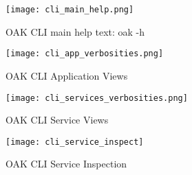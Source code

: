 \begin{figure}[p]
    \begin{adjustwidth}{-0.1\paperwidth}{-0.1\paperwidth}
        \centering
        \texttt{[image: cli\_main\_help.png]}
        \caption{OAK CLI main help text: oak -h}
        \label{fig:cli_main_help}
    \end{adjustwidth}

    \begin{adjustwidth}{-0.2\paperwidth}{-0.2\paperwidth}
        \centering
        \texttt{[image: cli\_app\_verbosities.png]}
        \caption{OAK CLI Application Views}
        \label{fig:cli_app_views}
    \end{adjustwidth}
\end{figure}

\begin{figure}[p]
    \centering
    \texttt{[image: cli\_services\_verbosities.png]}
    \caption{OAK CLI Service Views}
    \label{fig:cli_service_views}
\end{figure}

\begin{figure}[p]
    \begin{adjustwidth}{-0.1\paperwidth}{-0.1\paperwidth}
        \centering
        \texttt{[image: cli\_service\_inspect]}
        \caption{OAK CLI Service Inspection}
        \label{fig:cli_service_inspection}
    \end{adjustwidth}
\end{figure}
